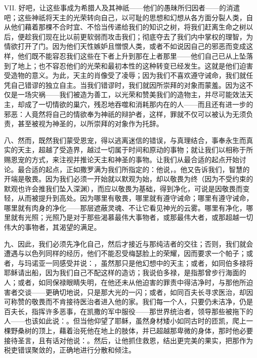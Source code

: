 VII. 好吧，让这些事成为希腊人及其神祇——他们的愚昧所归因者——的消遣吧；这些神祇将天主的光荣转向自己，以可耻的思想和幻想从各方面分裂人类，自从他们藉着那棵不合时宜、不恰当传递给我们的知识之树，将我们赶离生命之树以后，便趁我们现在比以前更软弱而攻击我们；彻底夺去了我们内中掌权的理智，为情欲打开了门。因为他们天性嫉妒且憎恨人类，或者不如说因自己的邪恶而变成这样，他们既不能容忍我们这些在下者上升到那在上者那里——他们自己已从上坠落到了地上；也不容忍他们的光荣和最初本性的这种转变已经发生。这就是他们迫害受造物的意义。为此，天主的肖像受了凌辱；因为我们不喜欢遵守诫命，我们就任凭自己错谬的独立自主。当我们错谬时，我们就因所崇拜的对象而蒙羞。因为这不仅是一场灾祸——我们被造为善工，以光荣和赞美我们的造物主，并尽可能效法天主，却成了一切情欲的巢穴，残忍地吞噬和消耗那内在的人——而且还有进一步的邪恶：人竟然将自己的情欲奉为神祇的辩护者，这样，罪就不仅可以被认为无须负责，甚至被视为神圣的，以所崇拜的对象作为托辞。\par

八、然而，既然我们蒙受恩宠，得以逃离迷信的错误，与真理结合，事奉永生而真实的天主，超越了受造界，越过一切属于时间和原动的事物；就让我们以相称于所赐恩宠的方式，来注视并推论天主和神圣的事物。让我们从最合适的起点开始讨论。最合适的起点，正如撒罗满为我们所指定的：他说，。他又告诉我们，智慧的开端是敬畏。因为我们必须一开始就以默观为始，却以敬畏为终（因为不受约束的默观也许会推我们坠入深渊），而应以敬畏为基础，得到净化，可说是因敬畏而变轻，从而被提升到高处。因为哪里有敬畏，哪里就有遵守诫命；哪里有遵守诫命，哪里就有肉身的净化——那层遮蔽灵魂、不让它看见神光的云雾。哪里有净化，哪里就有光照；光照乃是对于那些渴慕最伟大事物者，或那最伟大者，或那超越一切伟大的事物者，其渴望的满足。\par

九、因此，我们必须先净化自己，然后才接近与那纯洁者的交往；否则，我们就会遭遇与以色列同样的经历，他们不能忍受梅瑟脸上的荣耀，因而要求一个帕子；或者，与玛诺亚一同感受并说：，虽然那只是他幻想中的天主；或者，如同伯多禄将耶稣请出船，因为我们自己不配这样的造访；我说伯多禄，是指那曾步行海面的人；或者，如同保禄眼睛失明，在他还未从他迫害的罪责中得洁净时，与那他所迫害者交谈——更确切地说，只是那大光的一闪；或者，如同百夫长寻求医治，却因可称赞的敬畏而不肯接待医治者进入他的家。我们每一个人，只要仍未洁净，仍是百夫长，指挥许多恶事，在凯撒的军中服役——那世界统治者，领导那些被拖下的人——也该如此说：。但当他仰望了耶稣，虽然身材矮小如同古时的匝凯，爬上一棵野桑树的顶上，藉着治死他在地上的肢体，并已超越那卑微的身体，那时他必要接待圣言，且有话对他说：。然后，让他抓住救恩，结出更完美的果实，把那作为税吏错误聚敛的，正确地进行分散和倾注。\par

